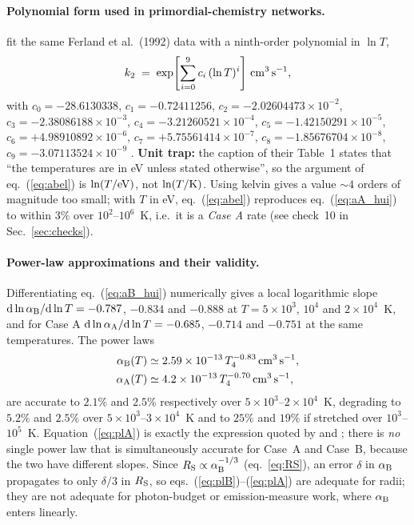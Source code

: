 \documentclass[11pt,a4paper]{article}
\newcommand{\aB}{\alpha_{\rm B}}
\newcommand{\aA}{\alpha_{\rm A}}
\newcommand{\cms}{\,{\rm cm^{3}\,s^{-1}}}
\begin{document}
\paragraph{Polynomial form used in primordial-chemistry networks.}
\citet{Abel1997} fit the same Ferland et al.\ (1992) data with a ninth-order polynomial in
$\ln T$,
\begin{equation}
  k_2 \;=\; \exp\!\left[\sum_{i=0}^{9} c_i \,(\ln T)^i\right]\cms,
  \label{eq:abel}
\end{equation}
with $c_0=-28.6130338$, $c_1=-0.72411256$, $c_2=-2.02604473\times10^{-2}$,
$c_3=-2.38086188\times10^{-3}$, $c_4=-3.21260521\times10^{-4}$, $c_5=-1.42150291\times10^{-5}$,
$c_6=+4.98910892\times10^{-6}$, $c_7=+5.75561414\times10^{-7}$, $c_8=-1.85676704\times10^{-8}$,
$c_9=-3.07113524\times10^{-9}$ \citep{Abel1997}.
\textbf{Unit trap:} the caption of their Table~1 states that ``the temperatures are in eV unless
stated otherwise'', so the argument of eq.~(\ref{eq:abel}) is $\ln(T/{\rm eV})$, not $\ln(T/{\rm
K})$. Using kelvin gives a value $\sim4$ orders of magnitude too small; with $T$ in eV,
eq.~(\ref{eq:abel}) reproduces eq.~(\ref{eq:aA_hui}) to within $3\%$ over $10^2$--$10^6$~K, i.e.\ it
is a \emph{Case A} rate (see check~10 in Sec.~\ref{sec:checks}).

\paragraph{Power-law approximations and their validity.}
Differentiating eq.~(\ref{eq:aB_hui}) numerically gives a local logarithmic slope
${\rm d}\ln\aB/{\rm d}\ln T = -0.787$, $-0.834$ and $-0.888$ at $T=5\times10^3$, $10^4$ and
$2\times10^4$~K, and for Case A ${\rm d}\ln\aA/{\rm d}\ln T = -0.685$, $-0.714$ and $-0.751$ at the
same temperatures. The power laws
\begin{align}
  \aB(T) &\simeq 2.59\times10^{-13}\,T_4^{-0.83}\cms, \label{eq:plB}\\
  \aA(T) &\simeq 4.2\times10^{-13}\,T_4^{-0.70}\cms, \label{eq:plA}
\end{align}
are accurate to $2.1\%$ and $2.5\%$ respectively over $5\times10^3$--$2\times10^4$~K, degrading to
$5.2\%$ and $2.5\%$ over $5\times10^3$--$3\times10^4$~K and to $25\%$ and $19\%$ if stretched over
$10^3$--$10^5$~K. Equation~(\ref{eq:plA}) is exactly the expression quoted by \citet{Gnedin2022} and
\citet{Choudhury2022}; there is \emph{no} single power law that is simultaneously accurate for
Case~A and Case~B, because the two have different slopes. Since $R_{\rm S}\propto\aB^{-1/3}$
(eq.~\ref{eq:RS}), an error $\delta$ in $\aB$ propagates to only $\delta/3$ in $R_{\rm S}$, so
eqs.~(\ref{eq:plB})--(\ref{eq:plA}) are adequate for radii; they are not adequate for photon-budget
or emission-measure work, where $\aB$ enters linearly.
\end{document}
